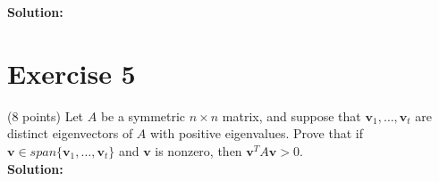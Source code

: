\documentclass{article}
\begin{document}
\textbf{Solution:}

\newpage

\section*{Exercise 5}
(8 points) Let $A$ be a symmetric $n \times n$ matrix, and suppose that $\mathbf{v}_1,\ldots,\mathbf{v}_t$ are distinct eigenvectors of $A$ with positive eigenvalues. Prove that if $\mathbf{v} \in span\{\mathbf{v}_1,\ldots,\mathbf{v}_t\}$ and $\mathbf{v}$ is nonzero, then $\mathbf{v}^T A\mathbf{v} > 0$. \\

\textbf{Solution:}

\newpage
\end{document}

